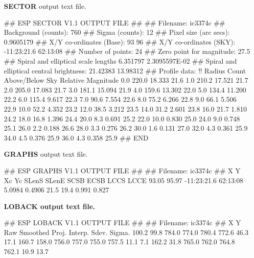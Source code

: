 \documentclass[twoside,11pt]{starlink}
\begin{document}
\newpage
\textbf{SECTOR} output text file.

\begin{terminalv}
## ESP SECTOR V1.1 OUTPUT FILE
##
## Filename:
ic3374c
## Background (counts):
760
## Sigma (counts):
12
## Pixel size (arc secs):
0.9605179
## X/Y co-ordinates (Base):
93 96
## X/Y co-ordinates (SKY):
-11:23:21.6 62:13:08
## Number of points:
24
## Zero point for magnitude:
27.5
## Spiral and elliptical scale lengths
6.351797 2.3095597E-02
## Spiral and elliptical central brightness:
21.42383 13.98312
## Profile data:
!! Radius      Count     Above/Below Sky    Relative Magnitude
      0.0       220.0       18.333             21.6
      1.0       210.2       17.521             21.7
      2.0       205.0       17.083             21.7
      3.0       181.1       15.094             21.9
      4.0       159.6       13.302             22.0
      5.0       134.4       11.200             22.2
      6.0       115.4        9.617             22.3
      7.0        90.6        7.554             22.6
      8.0        75.2        6.266             22.8
      9.0        66.1        5.506             22.9
     10.0        52.2        4.352             23.2
     12.0        38.5        3.212             23.5
     14.0        31.2        2.601             23.8
     16.0        21.7        1.810             24.2
     18.0        16.8        1.396             24.4
     20.0         8.3        0.691             25.2
     22.0        10.0        0.830             25.0
     24.0         9.0        0.748             25.1
     26.0         2.2        0.188             26.6
     28.0         3.3        0.276             26.2
     30.0         1.6        0.131             27.0
     32.0         4.3        0.361             25.9
     34.0         4.5        0.376             25.9
     36.0         4.3        0.358             25.9
## END
\end{terminalv}

\newpage
\textbf{GRAPHS} output text file.

\begin{terminalv}
## ESP GRAPHS V1.1 OUTPUT FILE
##
## Filename:
ic3374c
##  X       Y         Xc        Yc      SLenS    SLenE   SCSB  ECSB   LCCS  LCCE
   93.05   95.97 -11:23:21.6 62:13:08   5.0984   0.4906  21.5  19.4 0.991 0.827
\end{terminalv}


\bf{LOBACK} output text file.

\begin{terminalv}
## ESP LOBACK V1.1 OUTPUT FILE
##
## Filename:
ic3374c
##  X         Y        Raw   Smoothed   Proj.    Interp.    Sdev.    Sigma.
   100.2      99.8     784.0    774.0    780.4    772.6     46.3     17.1
   160.7     158.0     756.0    757.0    755.0    757.5     11.1      7.1
   162.2      31.8     765.0    762.0    764.8    762.1     10.9     13.7
\end{terminalv}
\end{document}
